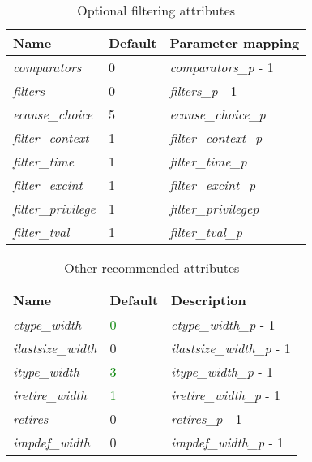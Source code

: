 \begin{table}[!h]
    \centering
    \caption{Optional filtering attributes}
    \label{tab:optionalAttributes}
    \begin{tabulary}{\textwidth}{|l|l|p{80mm}|}
        \hline
        \textbf{Name} & \textbf{Default} & \textbf{Parameter mapping} \\
        \hline
         \textit{comparators} & 0 & \textit{comparators\_p} - 1\\
        \hline
        \textit{filters} & 0 & \textit{filters\_p} - 1\\
        \hline
        \textit{ecause\_choice} & 5 & \textit{ecause\_choice\_p}\\
        \hline
        \textit{filter\_context} & 1 & \textit{filter\_context\_p}\\
        \hline
        \textit{filter\_time} & 1 & \textit{filter\_time\_p}\\
        \hline
        \textit{filter\_excint} & 1 & \textit{filter\_excint\_p}\\
        \hline
        \textit{filter\_privilege} & 1 & \textit{filter\_privilege\-p}\\
        \hline
        \textit{filter\_tval} & 1 & \textit{filter\_tval\_p}\\
        \hline
    \end{tabulary}
\end{table}

\begin{table}[!h]
    \centering
    \caption{Other recommended attributes}
    \label{tab:otherAttributes}
    \begin{tabulary}{\textwidth}{|l|l|p{80mm}|}
        \hline
        \textbf{Name} & \textbf{Default} & \textbf{Description} \\
        \hline
        \textit{ctype\_width} & \textcolor{green}{0} & \textit{ctype\_width\_p} - 1\\
        \hline
        \textit{ilastsize\_width} & 0 & \textit{ilastsize\_width\_p} - 1\\
        \hline
        \textit{itype\_width} & \textcolor{green}{3} & \textit{itype\_width\_p} - 1\\
        \hline
        \textit{iretire\_width} & \textcolor{green}{1} & \textit{iretire\_width\_p} - 1\\
        \hline
        \textit{retires} & 0 & \textit{retires\_p} - 1\\
        \hline
        \textit{impdef\_width} & 0 & \textit{impdef\_width\_p} - 1\\
        \hline
    \end{tabulary}
\end{table}

